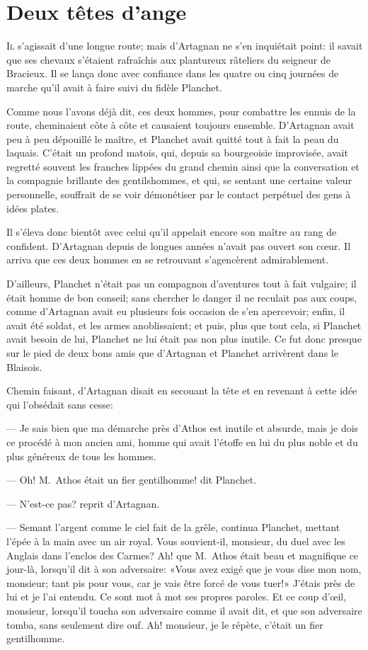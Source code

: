 \chapter{Deux têtes d'ange}

\lettrine{I}{l} s'agissait d'une longue route; mais d'Artagnan ne s'en inquiétait point: il savait que ses chevaux s'étaient rafraîchis aux plantureux râteliers du seigneur de Bracieux. Il se lança donc avec confiance dans les quatre ou cinq journées de marche qu'il avait à faire suivi du fidèle Planchet.

Comme nous l'avons déjà dit, ces deux hommes, pour combattre les ennuis de la route, cheminaient côte à côte et causaient toujours ensemble. D'Artagnan avait peu à peu dépouillé le maître, et Planchet avait quitté tout à fait la peau du laquais. C'était un profond matois, qui, depuis sa bourgeoisie improvisée, avait regretté souvent les franches lippées du grand chemin ainsi que la conversation et la compagnie brillante des gentilshommes, et qui, se sentant une certaine valeur personnelle, souffrait de se voir démonétiser par le contact perpétuel des gens à idées plates.

Il s'éleva donc bientôt avec celui qu'il appelait encore son maître au rang de confident. D'Artagnan depuis de longues années n'avait pas ouvert son cœur. Il arriva que ces deux hommes en se retrouvant s'agencèrent admirablement.

D'ailleurs, Planchet n'était pas un compagnon d'aventures tout à fait vulgaire; il était homme de bon conseil; sans chercher le danger il ne reculait pas aux coups, comme d'Artagnan avait eu plusieurs fois occasion de s'en apercevoir; enfin, il avait été soldat, et les armes anoblissaient; et puis, plus que tout cela, si Planchet avait besoin de lui, Planchet ne lui était pas non plus inutile. Ce fut donc presque sur le pied de deux bons amis que d'Artagnan et Planchet arrivèrent dans le Blaisois.

Chemin faisant, d'Artagnan disait en secouant la tête et en revenant à cette idée qui l'obsédait sans cesse:

— Je sais bien que ma démarche près d'Athos est inutile et absurde, mais je dois ce procédé à mon ancien ami, homme qui avait l'étoffe en lui du plus noble et du plus généreux de tous les hommes.

— Oh! M.~Athos était un fier gentilhomme! dit Planchet.

— N'est-ce pas? reprit d'Artagnan.

— Semant l'argent comme le ciel fait de la grêle, continua Planchet, mettant l'épée à la main avec un air royal. Vous souvient-il, monsieur, du duel avec les Anglais dans l'enclos des Carmes? Ah! que M.~Athos était beau et magnifique ce jour-là, lorsqu'il dit à son adversaire: «Vous avez exigé que je vous dise mon nom, monsieur; tant pis pour vous, car je vais être forcé de vous tuer!» J'étais près de lui et je l'ai entendu. Ce sont mot à mot ses propres paroles. Et ce coup d'œil, monsieur, lorsqu'il toucha son adversaire comme il avait dit, et que son adversaire tomba, sans seulement dire ouf. Ah! monsieur, je le répète, c'était un fier gentilhomme.

